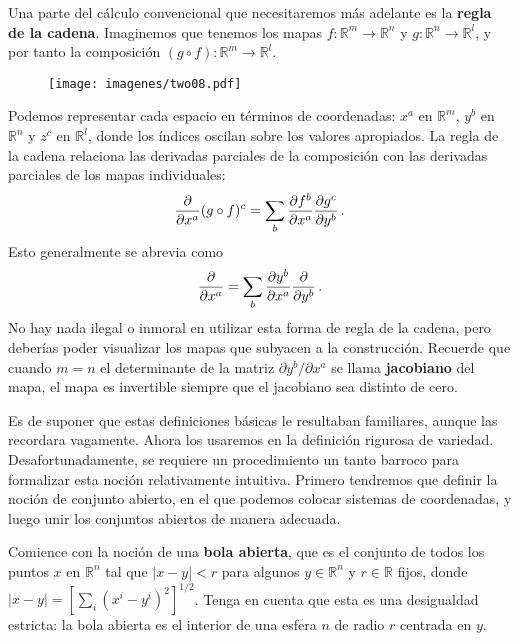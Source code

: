 \documentclass[11pt,b5paper,openany,twoside]{book}
\begin{document}
Una parte del cálculo convencional que necesitaremos más adelante es la {\bf regla de la cadena}.
Imaginemos que tenemos los mapas $f:\mathbb{R}^m\rightarrow \mathbb{R}^n$ y $g:\mathbb{R}^n\rightarrow \mathbb{R}^l$, y por tanto la composición $(g\circ f):\mathbb{R}^m\rightarrow\mathbb{R}^l$.

\begin{figure}[h]
\centering
\texttt{[image: imagenes/two08.pdf]}
\end{figure}

\noindent
Podemos representar cada espacio en términos de coordenadas: $x^a$ en $\mathbb{R}^m$, $y^b$ en $\mathbb{R}^n$ y $z^c$ en $\mathbb{R}^l$, donde los índices oscilan sobre los valores apropiados.
La regla de la cadena relaciona las derivadas parciales de la composición con las derivadas parciales de los mapas individuales:
\begin{equation}
{{\partial}\over{\partial x^a}}(g\circ f)^c =
\sum_b {{\partial f^b}\over{\partial x^a}}{{\partial g^c}
\over{\partial y^b}}\,.\label{2.2}
\end{equation}
Esto generalmente se abrevia como
\begin{equation}
{{\partial}\over{\partial x^a}} = \sum_b {{\partial y^b}\over
{\partial x^a}}{{\partial}\over{\partial y^b}}\,.\label{2.3}
\end{equation}
No hay nada ilegal o inmoral en utilizar esta forma de regla de la cadena, pero deberías poder visualizar los mapas que subyacen a la construcción.
Recuerde que cuando $m=n$ el determinante de la matriz $\partial y^b/\partial x^a$ se llama {\bf jacobiano} del mapa, el mapa es invertible siempre que el jacobiano sea distinto de cero.

Es de suponer que estas definiciones básicas le resultaban familiares, aunque las recordara vagamente.
Ahora los usaremos en la definición rigurosa de variedad.
Desafortunadamente, se requiere un procedimiento un tanto barroco para formalizar esta noción relativamente intuitiva.
Primero tendremos que definir la noción de conjunto abierto, en el que podemos colocar sistemas de coordenadas, y luego unir los conjuntos abiertos de manera adecuada.

Comience con la noción de una {\bf bola abierta}, que es el conjunto de todos los puntos $x$ en $\mathbb{R}^n$ tal que $|x-y|<r$ para algunos $y\in \mathbb{R}^n$ y $r\in \mathbb{R}$ fijos, donde $|x-y|=[\sum_i(x^i-y^i)^2]^{1/2}$.
Tenga en cuenta que esta es una desigualdad estricta: la bola abierta es el interior de una esfera $n$ de radio $r$ centrada en $y$.
\end{document}
